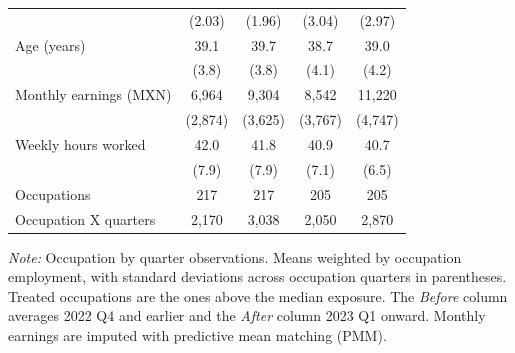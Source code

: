 \begin{table}[H]
\begin{threeparttable}
\begin{tabular}[t]{lcccc}
                                     & (2.03)                      & (1.96)                      & (3.04)      & (2.97)      \\
      \addlinespace[3pt]
      Age (years)                    & 39.1                        & 39.7                        & 38.7        & 39.0        \\
                                     & (3.8)                       & (3.8)                       & (4.1)       & (4.2)       \\
      \addlinespace[3pt]
      Monthly earnings (MXN)         & 6,964                       & 9,304                       & 8,542       & 11,220      \\
                                     & (2,874)                     & (3,625)                     & (3,767)     & (4,747)     \\
      \addlinespace[3pt]
      Weekly hours worked            & 42.0                        & 41.8                        & 40.9        & 40.7        \\
                                     & (7.9)                       & (7.9)                       & (7.1)       & (6.5)       \\
      \midrule
      Occupations                    & 217                         & 217                         & 205         & 205         \\
      Occupation X quarters          & 2,170                       & 3,038                       & 2,050       & 2,870       \\
      \bottomrule
    \end{tabular}
    \begin{tablenotes}
      \item \textit{Note: } Occupation by quarter observations. Means weighted by occupation employment, with standard deviations across occupation quarters in parentheses. Treated occupations are the ones above the median exposure. The \textit{Before} column averages 2022 Q4 and earlier and the \textit{After} column 2023 Q1 onward. Monthly earnings are imputed with predictive mean matching (PMM).
    \end{tablenotes}
  \end{threeparttable}
\end{table}


